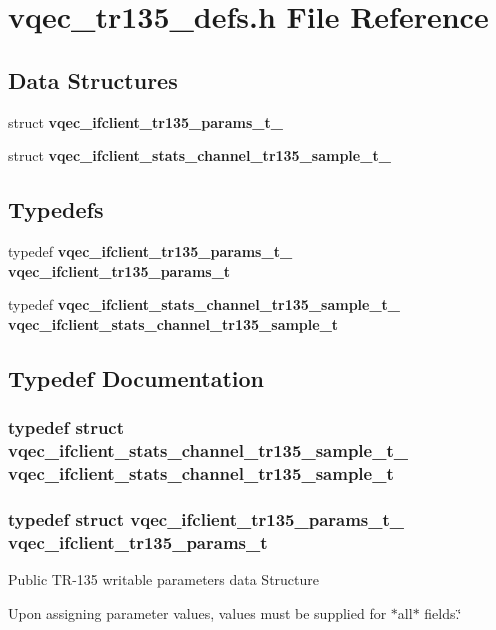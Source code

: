 \section{vqec\_\-tr135\_\-defs.h File Reference}
\label{vqec__tr135__defs_8h}
\subsection*{Data Structures}
\begin{CompactItemize}
\item 
struct \bf{vqec\_\-ifclient\_\-tr135\_\-params\_\-t\_\-}
\item 
struct \bf{vqec\_\-ifclient\_\-stats\_\-channel\_\-tr135\_\-sample\_\-t\_\-}
\end{CompactItemize}
\subsection*{Typedefs}
\begin{CompactItemize}
\item 
typedef \bf{vqec\_\-ifclient\_\-tr135\_\-params\_\-t\_\-} \bf{vqec\_\-ifclient\_\-tr135\_\-params\_\-t}
\item 
typedef \bf{vqec\_\-ifclient\_\-stats\_\-channel\_\-tr135\_\-sample\_\-t\_\-} \bf{vqec\_\-ifclient\_\-stats\_\-channel\_\-tr135\_\-sample\_\-t}
\end{CompactItemize}


\subsection{Typedef Documentation}
\subsubsection{\setlength{\rightskip}{0pt plus 5cm}typedef struct \bf{vqec\_\-ifclient\_\-stats\_\-channel\_\-tr135\_\-sample\_\-t\_\-}  \bf{vqec\_\-ifclient\_\-stats\_\-channel\_\-tr135\_\-sample\_\-t}}\label{vqec__tr135__defs_8h_6c4f0d232dace2e8b340e24ce9deea0a}


\subsubsection{\setlength{\rightskip}{0pt plus 5cm}typedef struct \bf{vqec\_\-ifclient\_\-tr135\_\-params\_\-t\_\-}  \bf{vqec\_\-ifclient\_\-tr135\_\-params\_\-t}}\label{vqec__tr135__defs_8h_4de2f12b0f2a0c0e6ba84389a6dfc730}


Public TR-135 writable parameters data Structure

Upon assigning parameter values, values must be supplied for $\ast$all$\ast$ fields.\char`\"{} 